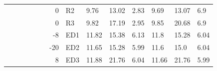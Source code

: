 {\begin{minipage}{\linewidth}
\begin{tabular}{l|l|l|l|c|c|r|l|lll|lll}
                                              &                                          &                                           &                                           &                                            &                                                                                         & 0                                                                                              & R2                                        & 9.76  & 13.02 & 2.83      & 9.69  & 13.07 & 6.9        \\
                                              &                                          &                                           &                                           &                                            &                                                                                         & 0                                                                                              & R3                                        & 9.82  & 17.19 & 2.95      & 9.85  & 20.68 & 6.9        \\
                                              &                                          &                                           &                                           &                                            &                                                                                         & -8                                                                                             & ED1                                       & 11.82 & 15.38 & 6.13      & 11.8  & 15.28 & 6.04       \\
                                              &                                          &                                           &                                           &                                            &                                                                                         & -20                                                                                            & ED2                                       & 11.65 & 15.28 & 5.99      & 11.6  & 15.0  & 6.04       \\
                                              &                                          &                                           &                                           &                                            &                                                                                         & 8                                                                                              & ED3                                       & 11.88 & 21.76 & 6.04      & 11.66 & 21.76 & 5.99       \\

\end{tabular}
\end{minipage}}
